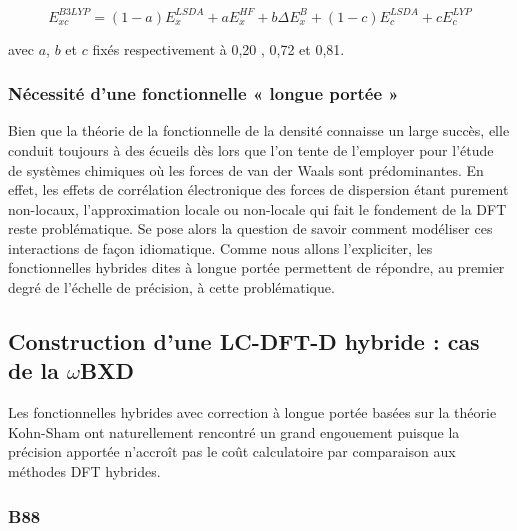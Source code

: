 	\begin{equation}
	E_{xc}^{B3LYP} = (1-a) E_{x}^{LSDA} + a E_{x}^{HF} + b \Delta E_{x}^{B} + (1-c) E_{c}^{LSDA} + c E_{c}^{LYP}
	\label{B3LYP}
	\end{equation}
	
	\noindent avec $a$, $b$ et $c$ fixés respectivement à 0,20 , 0,72 et 0,81.
	
	
	\subsubsection{Nécessité d'une fonctionnelle « longue portée »}
	
	Bien que la théorie de la fonctionnelle de la densité connaisse un large succès, elle conduit toujours à des écueils dès lors que l'on tente de l'employer pour l'étude de systèmes chimiques où les forces de van der Waals sont prédominantes. 
	En effet, les effets de corrélation électronique des forces de dispersion étant purement non-locaux, l'approximation locale ou non-locale qui fait le fondement de la DFT reste problématique. Se pose alors la question de savoir comment modéliser ces interactions de façon idiomatique.
	 Comme nous allons l'expliciter, les fonctionnelles hybrides dites \og à longue portée \fg{} permettent de répondre, au premier degré de l'échelle de précision, à cette problématique. 
	
	
	\subsection[LC-DFT-D hybride : $\omega$BXD]{Construction d'une LC-DFT-D hybride : cas de la $\omega$BXD}
	Les fonctionnelles hybrides avec correction à longue portée basées sur la théorie Kohn-Sham ont naturellement rencontré un grand engouement puisque la précision apportée n'accroît pas le coût calculatoire par comparaison aux méthodes DFT hybrides.
	
	\subsubsection{B88}
	
